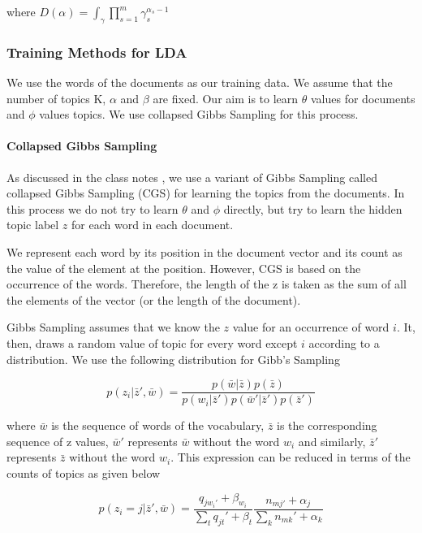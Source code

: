 \documentclass[11pt,a4paper,oneside]{article}
\begin{document}
where ${D(\alpha)} = \int_\gamma \prod^m_{s=1}\gamma^{\alpha_s - 1}_s$

\subsubsection{Training Methods for LDA}

We use the words of the documents as our training data. We assume that the number of topics K, $\alpha$ and $\beta$ are fixed. Our aim is to learn $\theta$ values for documents and $\phi$ values topics. We use collapsed Gibbs Sampling for this process.

\paragraph*{Collapsed Gibbs Sampling}

As discussed in the class notes \cite{classNotes}, we use a variant of Gibbs Sampling called collapsed Gibbs Sampling (CGS) for learning the topics from the documents. In this process we do not try to learn $\theta$ and $\phi$ directly, but try to learn the hidden topic label $z$ for each word in each document.

We represent each word by its position in the document vector and its count as the value of the element at the position. However, CGS is based on the occurrence of the words. Therefore, the length of the z is taken as the sum of all the elements of the vector (or the length of the document).

Gibbs Sampling assumes that we know the $z$ value for an occurrence of word $i$. It, then, draws a random value of topic for every word except $i$ according to a distribution. We use the following distribution for Gibb's Sampling

\begin{equation}
p(z_i|\bar{z}', \bar{w}) = \frac{p(\bar{w} | \bar{z}) p(\bar{z})}{p(w_i|\bar{z}')p(\bar{w}'|\bar{z}')p(\bar{z}')}
\end{equation}

where $\bar{w}$ is the sequence of words of the vocabulary, $\bar{z}$ is the corresponding sequence of z values, $\bar{w}'$ represents $\bar{w}$ without the word $w_i$ and similarly, $\bar{z}'$ represents $\bar{z}$ without the word $w_i$. This expression can be reduced in terms of the counts of topics as given below

\begin{equation}
\label{prob}
p(z_i = j | \bar{z}', \bar{w}) = \frac{q_{j w_{i}'} + \beta_{w_i}}{\sum_t{q_{jt}' + \beta_t}}\frac{n_{mj'} + \alpha_j}{\sum_k{n_{mk}' + \alpha_k}}
\end{equation}
\end{document}
